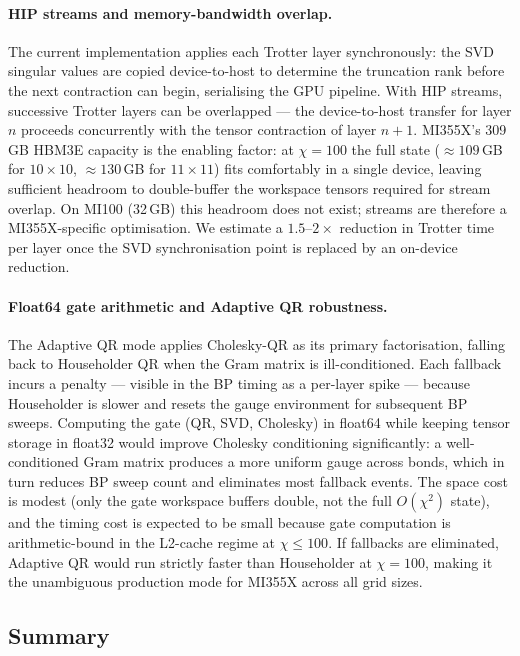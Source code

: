 \paragraph{HIP streams and memory-bandwidth overlap.}
The current implementation applies each Trotter layer synchronously:
the SVD singular values are copied device-to-host to determine the
truncation rank before the next contraction can begin, serialising the
GPU pipeline.
With HIP streams, successive Trotter layers can be overlapped ---
the device-to-host transfer for layer $n$ proceeds concurrently with
the tensor contraction of layer $n+1$.
MI355X's 309\,GB HBM3E capacity is the enabling factor: at $\chi=100$
the full state (${\approx}109$\,GB for $10\times10$, ${\approx}130$\,GB
for $11\times11$) fits comfortably in a single device, leaving sufficient
headroom to double-buffer the workspace tensors required for stream overlap.
On MI100 (32\,GB) this headroom does not exist; streams are therefore
a MI355X-specific optimisation.
We estimate a $1.5$--$2\times$ reduction in Trotter time per layer once
the SVD synchronisation point is replaced by an on-device reduction.

\paragraph{Float64 gate arithmetic and Adaptive QR robustness.}
The Adaptive QR mode applies Cholesky-QR as its primary factorisation,
falling back to Householder QR when the Gram matrix is ill-conditioned.
Each fallback incurs a penalty --- visible in the BP timing as a
per-layer spike --- because Householder is slower and resets the gauge
environment for subsequent BP sweeps.
Computing the gate (QR, SVD, Cholesky) in float64 while keeping tensor
storage in float32 would improve Cholesky conditioning significantly:
a well-conditioned Gram matrix produces a more uniform gauge across bonds,
which in turn reduces BP sweep count and eliminates most fallback events.
The space cost is modest (only the gate workspace buffers double, not the
full $O(\chi^2)$ state), and the timing cost is expected to be small
because gate computation is arithmetic-bound in the L2-cache regime
at $\chi \leq 100$.
If fallbacks are eliminated, Adaptive QR would run strictly faster than
Householder at $\chi=100$, making it the unambiguous production mode for
MI355X across all grid sizes.

\subsection*{Summary}


